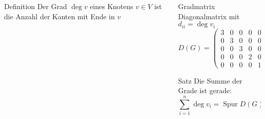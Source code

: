 \begin{frame}[t]
\begin{columns}[t,onlytextwidth]
\begin{column}{0.48\textwidth}
\begin{center}
\begin{tikzpicture}[>=latex,thick]
\end{tikzpicture}
\end{center}
\begin{block}{Definition}
Der Grad
$\deg v$
eines Knotens $v\in V$ ist die Anzahl der Kanten mit Ende in $v$
\end{block}
\end{column}
\begin{column}{0.48\textwidth}
\begin{block}{Gradmatrix}
Diagonalmatrix mit $d_{ii}=\deg v_i$
\[
D(G)
=
\begin{pmatrix}
3&0&0&0&0\\
0&3&0&0&0\\
0&0&3&0&0\\
0&0&0&2&0\\
0&0&0&0&1
\end{pmatrix}
\]
\end{block}
\begin{block}{Satz}
Die Summe der Grade ist gerade:
\[
\sum_{i=1}^n\deg v_i = \operatorname{Spur} D(G) \equiv 0 \mod 2
\]
\end{block}
\end{column}
\end{columns}
\end{frame}

